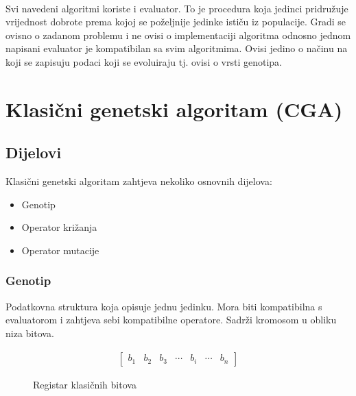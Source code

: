 \documentclass[times, utf8, zavrsni, numeric]{fer}
\begin{document}
\paragraph{}
Svi navedeni algoritmi koriste i evaluator.
To je procedura koja jedinci pridružuje vrijednost dobrote  prema kojoj se poželjnije jedinke ističu iz populacije. Gradi se ovisno o zadanom problemu i ne ovisi o implementaciji algoritma odnosno jednom napisani evaluator je kompatibilan sa svim algoritmima. Ovisi jedino o načinu na koji se zapisuju podaci koji se evoluiraju tj. ovisi o vrsti genotipa.

\section{Klasični genetski algoritam (CGA)}
\subsection{Dijelovi}
Klasični genetski algoritam zahtjeva nekoliko osnovnih dijelova:
\begin{itemize}
\item Genotip 
\item Operator križanja 
\item Operator mutacije
\end{itemize}

\subsubsection{Genotip}
Podatkovna struktura koja opisuje jednu jedinku. Mora biti kompatibilna s evaluatorom i zahtjeva sebi kompatibilne operatore. Sadrži kromosom u obliku niza bitova.
\begin{figure}[htb]
\centering
\begin{align*}
\begin{bmatrix}
b_1 & b_2 & b_3 & \cdots & b_i & \cdots & b_n
\end{bmatrix}
\end{align*}
\caption{Registar klasičnih bitova}
\end{figure}
\end{document}
